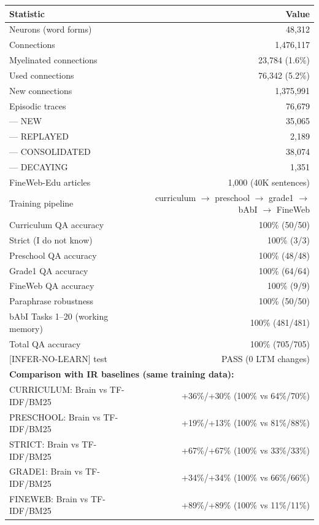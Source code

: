 \documentclass[11pt]{article}
\begin{document}
\begin{table}[h]
\centering
\begin{tabular}{lr}
\toprule
Statistic & Value \\
\midrule
Neurons (word forms) & 48{,}312 \\
Connections & 1{,}476{,}117 \\
Myelinated connections & 23{,}784 (1.6\%) \\
Used connections & 76{,}342 (5.2\%) \\
New connections & 1{,}375{,}991 \\
Episodic traces & 76{,}679 \\
\quad --- NEW & 35{,}065 \\
\quad --- REPLAYED & 2{,}189 \\
\quad --- CONSOLIDATED & 38{,}074 \\
\quad --- DECAYING & 1{,}351 \\
FineWeb-Edu articles & 1{,}000 (40K sentences) \\
Training pipeline & curriculum $\rightarrow$ preschool $\rightarrow$ grade1 $\rightarrow$ bAbI $\rightarrow$ FineWeb \\
Curriculum QA accuracy & 100\% (50/50) \\
Strict (I do not know) & 100\% (3/3) \\
Preschool QA accuracy & 100\% (48/48) \\
Grade1 QA accuracy & 100\% (64/64) \\
FineWeb QA accuracy & 100\% (9/9) \\
Paraphrase robustness & 100\% (50/50) \\
bAbI Tasks 1--20 (working memory) & 100\% (481/481) \\
Total QA accuracy & 100\% (705/705) \\
{[}INFER-NO-LEARN{]} test & PASS (0 LTM changes) \\
\midrule
\multicolumn{2}{l}{\textbf{Comparison with IR baselines (same training data):}} \\
CURRICULUM: Brain vs TF-IDF/BM25 & +36\%/+30\% (100\% vs 64\%/70\%) \\
PRESCHOOL: Brain vs TF-IDF/BM25 & +19\%/+13\% (100\% vs 81\%/88\%) \\
STRICT: Brain vs TF-IDF/BM25 & +67\%/+67\% (100\% vs 33\%/33\%) \\
GRADE1: Brain vs TF-IDF/BM25 & +34\%/+34\% (100\% vs 66\%/66\%) \\
FINEWEB: Brain vs TF-IDF/BM25 & +89\%/+89\% (100\% vs 11\%/11\%) \\

\end{tabular}
\end{table}
\end{document}
